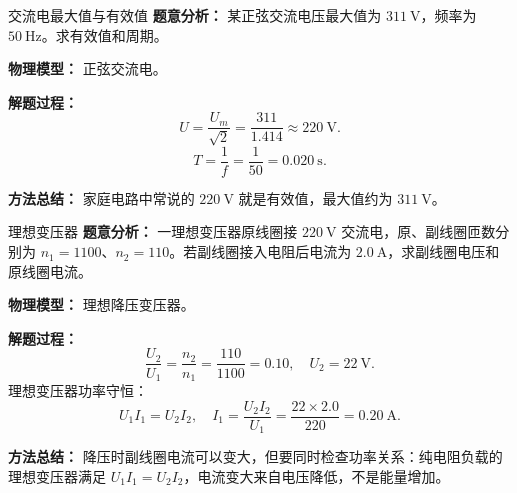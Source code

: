 \begin{examplebox}{交流电最大值与有效值}
\textbf{题意分析：} 某正弦交流电压最大值为 $311\ \mathrm{V}$，频率为 $50\ \mathrm{Hz}$。求有效值和周期。

\textbf{物理模型：} 正弦交流电。

\begin{center}

\end{center}

\textbf{解题过程：}
\[
U=\frac{U_m}{\sqrt2}=\frac{311}{1.414}\approx220\ \mathrm{V}.
\]
\[
T=\frac1f=\frac1{50}=0.020\ \mathrm{s}.
\]

\textbf{方法总结：} 家庭电路中常说的 $220\ \mathrm{V}$ 就是有效值，最大值约为 $311\ \mathrm{V}$。
\end{examplebox}

\begin{examplebox}{理想变压器}
\textbf{题意分析：} 一理想变压器原线圈接 $220\ \mathrm{V}$ 交流电，原、副线圈匝数分别为 $n_1=1100$、$n_2=110$。若副线圈接入电阻后电流为 $2.0\ \mathrm{A}$，求副线圈电压和原线圈电流。

\textbf{物理模型：} 理想降压变压器。

\begin{center}

\end{center}

\textbf{解题过程：}
\[
\frac{U_2}{U_1}=\frac{n_2}{n_1}=\frac{110}{1100}=0.10,
\quad U_2=22\ \mathrm{V}.
\]
理想变压器功率守恒：
\[
U_1I_1=U_2I_2,
\quad I_1=\frac{U_2I_2}{U_1}
=\frac{22\times2.0}{220}=0.20\ \mathrm{A}.
\]

\textbf{方法总结：} 降压时副线圈电流可以变大，但要同时检查功率关系：纯电阻负载的理想变压器满足 $U_1I_1=U_2I_2$，电流变大来自电压降低，不是能量增加。
\end{examplebox}


